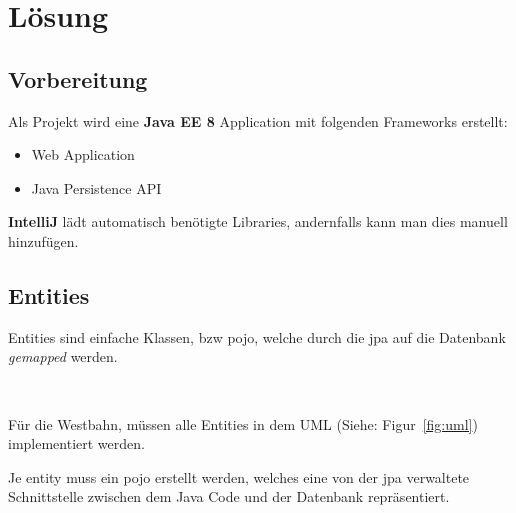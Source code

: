 
\section{Lösung}

\subsection{Vorbereitung}

Als Projekt wird eine \textbf{Java EE 8} Application mit folgenden Frameworks erstellt:
\begin{itemize}
    \item Web Application
    \item Java Persistence API
\end{itemize}
\textbf{IntelliJ} lädt automatisch benötigte Libraries, andernfalls kann man dies manuell hinzufügen.

\subsection{Entities}

Entities sind einfache Klassen, bzw \gls{pojo}, welche durch die \gls{jpa} auf die Datenbank \textit{gemapped} werden.

\

Für die Westbahn, müssen alle Entities in dem UML (Siehe: Figur~\ref{fig:uml}) implementiert werden.

Je \gls{entity} muss ein \gls{pojo} erstellt werden, welches eine von der \gls{jpa} verwaltete Schnittstelle zwischen dem Java Code und der Datenbank repräsentiert.
